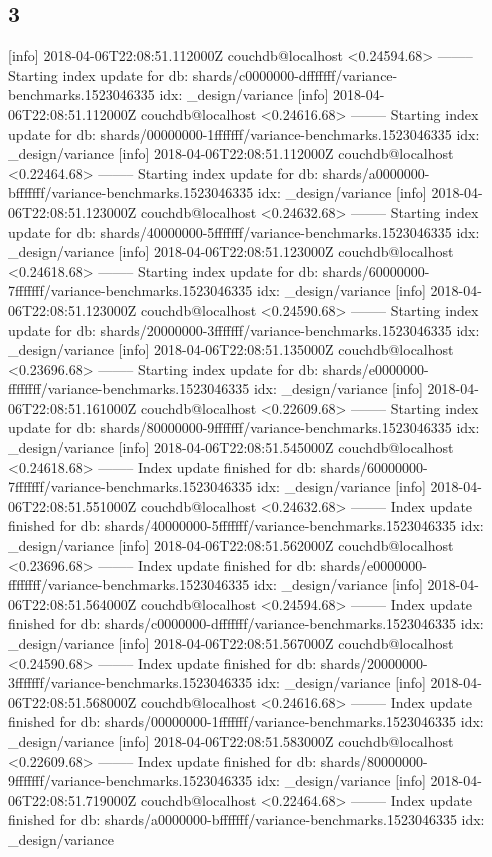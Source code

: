 \subsection{3}
[info] 2018-04-06T22:08:51.112000Z couchdb@localhost <0.24594.68> -------- Starting index update for db: shards/c0000000-dfffffff/variance-benchmarks.1523046335 idx: _design/variance
[info] 2018-04-06T22:08:51.112000Z couchdb@localhost <0.24616.68> -------- Starting index update for db: shards/00000000-1fffffff/variance-benchmarks.1523046335 idx: _design/variance
[info] 2018-04-06T22:08:51.112000Z couchdb@localhost <0.22464.68> -------- Starting index update for db: shards/a0000000-bfffffff/variance-benchmarks.1523046335 idx: _design/variance
[info] 2018-04-06T22:08:51.123000Z couchdb@localhost <0.24632.68> -------- Starting index update for db: shards/40000000-5fffffff/variance-benchmarks.1523046335 idx: _design/variance
[info] 2018-04-06T22:08:51.123000Z couchdb@localhost <0.24618.68> -------- Starting index update for db: shards/60000000-7fffffff/variance-benchmarks.1523046335 idx: _design/variance
[info] 2018-04-06T22:08:51.123000Z couchdb@localhost <0.24590.68> -------- Starting index update for db: shards/20000000-3fffffff/variance-benchmarks.1523046335 idx: _design/variance
[info] 2018-04-06T22:08:51.135000Z couchdb@localhost <0.23696.68> -------- Starting index update for db: shards/e0000000-ffffffff/variance-benchmarks.1523046335 idx: _design/variance
[info] 2018-04-06T22:08:51.161000Z couchdb@localhost <0.22609.68> -------- Starting index update for db: shards/80000000-9fffffff/variance-benchmarks.1523046335 idx: _design/variance
[info] 2018-04-06T22:08:51.545000Z couchdb@localhost <0.24618.68> -------- Index update finished for db: shards/60000000-7fffffff/variance-benchmarks.1523046335 idx: _design/variance
[info] 2018-04-06T22:08:51.551000Z couchdb@localhost <0.24632.68> -------- Index update finished for db: shards/40000000-5fffffff/variance-benchmarks.1523046335 idx: _design/variance
[info] 2018-04-06T22:08:51.562000Z couchdb@localhost <0.23696.68> -------- Index update finished for db: shards/e0000000-ffffffff/variance-benchmarks.1523046335 idx: _design/variance
[info] 2018-04-06T22:08:51.564000Z couchdb@localhost <0.24594.68> -------- Index update finished for db: shards/c0000000-dfffffff/variance-benchmarks.1523046335 idx: _design/variance
[info] 2018-04-06T22:08:51.567000Z couchdb@localhost <0.24590.68> -------- Index update finished for db: shards/20000000-3fffffff/variance-benchmarks.1523046335 idx: _design/variance
[info] 2018-04-06T22:08:51.568000Z couchdb@localhost <0.24616.68> -------- Index update finished for db: shards/00000000-1fffffff/variance-benchmarks.1523046335 idx: _design/variance
[info] 2018-04-06T22:08:51.583000Z couchdb@localhost <0.22609.68> -------- Index update finished for db: shards/80000000-9fffffff/variance-benchmarks.1523046335 idx: _design/variance
[info] 2018-04-06T22:08:51.719000Z couchdb@localhost <0.22464.68> -------- Index update finished for db: shards/a0000000-bfffffff/variance-benchmarks.1523046335 idx: _design/variance